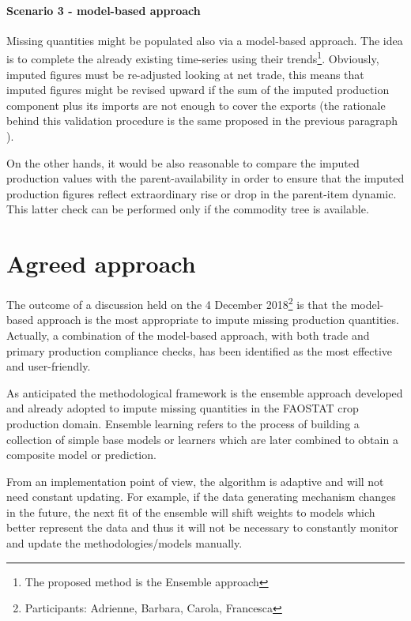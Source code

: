 \documentclass[nojss]{jss}
\begin{document}
\paragraph{Scenario 3 - model-based approach}

Missing quantities might be populated also via a model-based approach. The idea is to complete the already existing time-series using their trends\footnote{The proposed method is the Ensemble approach}. Obviously, imputed figures must be re-adjusted looking at net trade, this means that imputed figures might be revised upward if the sum of the imputed production component plus its imports are not enough to cover the exports (the rationale behind this validation procedure is the same proposed in the previous paragraph ).

On the other hands, it would be also reasonable to compare the imputed production values with the parent-availability in order to ensure that the imputed production figures reflect extraordinary rise or drop in the parent-item dynamic. This latter check can be performed only if the commodity tree is available.

\section{Agreed approach }

The outcome of a discussion held on the 4 December 2018\footnote{Participants: Adrienne, Barbara, Carola, Francesca}  is that the model-based approach is the most appropriate to impute missing production quantities. Actually, a combination of the model-based approach, with both trade and primary production compliance checks, has been identified as the most effective and user-friendly.

As anticipated the methodological framework is the ensemble approach developed and already adopted to impute missing quantities in the FAOSTAT crop production domain. Ensemble learning refers to the process of building a collection of simple base models or learners which are later combined to obtain a composite model or prediction.

From an implementation point of view, the algorithm is adaptive and will not need constant updating. For example, if the data generating mechanism changes in the future, the next fit of the ensemble will shift weights to models which better represent the data and thus it will not be necessary to constantly monitor and update the methodologies/models manually.
\end{document}
